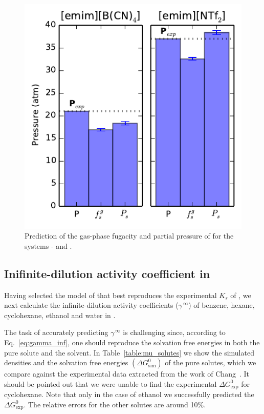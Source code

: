 \documentclass[3p,twocolumn]{elsarticle}
\begin{document}
\begin{figure}[ht]
\includegraphics[width=\linewidth]{pressure_est.pdf}
\caption{Prediction of the gas-phase fugacity and partial pressure of  for the systems -\ce{[emim][B(CN)_4]} and \ce{[emim][NTf_2]}.}
\label{fig:pressure}
\end{figure}

\subsection{Inifinite-dilution activity coefficient in \ce{[emim][B(CN)_4]}}
\label{sec:act_results}

Having selected the model of \ce{[emim][B(CN)_4]} that best reproduces the experimental $K_s$ of , we next calculate the infinite-dilution activity coefficients ($\gamma^{\, \infty}$) of benzene, hexane, cyclohexane, ethanol and water in \ce{[emim][B(CN)_4]}.

The task of accurately predicting $\gamma^{\, \infty}$ is challenging since, according to Eq.~\eqref{eq:gamma_inf}, one should reproduce the solvation free energies in both the pure solute and the solvent.
In Table~\ref{table:mu_solutes} we show the simulated densities and the solvation free energies $(\Delta G^{0}_{\text{sim}})$ of the pure solutes, which we compare against the experimental data extracted from the work of Chang~\cite{Chang_2009}.
It should be pointed out that we were unable to find the experimental $\Delta G^{0}_\text{exp}$ for cyclohexane.
Note that only in the case of ethanol we successfully predicted the $\Delta G^{0}_\text{exp}$.
The relative errors for the other solutes are around 10\%.
\end{document}
